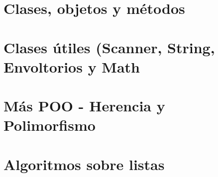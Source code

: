 \documentclass[12pt]{report} %
\begin{document}
\part{Clases, objetos y métodos}



\part{Clases útiles (Scanner, String, Envoltorios y Math}



\part{Más POO - Herencia y Polimorfismo}



\part{Algoritmos sobre listas}





\end{document}
